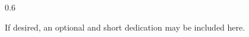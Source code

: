 \cleardoublepage

\vspace*{8cm}

\hfill
\begin{parbox}{0.6\textwidth}{
        \begin{flushright}

            If desired, an optional and short dedication may be included here.

        \end{flushright}}
\end{parbox}


